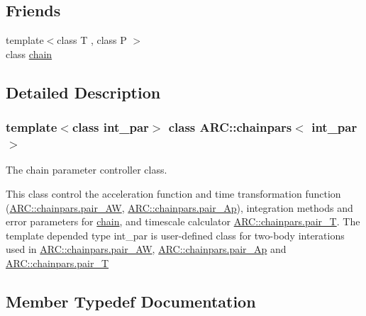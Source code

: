 \subsection*{Friends}
\begin{DoxyCompactItemize}
\item 
{\footnotesize template$<$class T , class P $>$ }\\class \hyperlink{classARC_1_1chainpars_a569feb0e3508338e81284973f08c5750}{chain}
\end{DoxyCompactItemize}


\subsection{Detailed Description}
\subsubsection*{template$<$class int\+\_\+par$>$\newline
class A\+R\+C\+::chainpars$<$ int\+\_\+par $>$}

The chain parameter controller class. 

This class control the acceleration function and time transformation function (\hyperlink{classARC_1_1chainpars_a9558124278a55c0301642e1df63be063}{A\+R\+C\+::chainpars.\+pair\+\_\+\+AW}, \hyperlink{classARC_1_1chainpars_a80fcc6e3b5ce69025126bc49d90f233c}{A\+R\+C\+::chainpars.\+pair\+\_\+\+Ap}), integration methods and error parameters for \hyperlink{classARC_1_1chain}{chain}, and timescale calculator \hyperlink{classARC_1_1chainpars_a860194e916f3ae900e93beedd277fa3c}{A\+R\+C\+::chainpars.\+pair\+\_\+T}. The template depended type int\+\_\+par is user-\/defined class for two-\/body interations used in \hyperlink{classARC_1_1chainpars_a9558124278a55c0301642e1df63be063}{A\+R\+C\+::chainpars.\+pair\+\_\+\+AW}, \hyperlink{classARC_1_1chainpars_a80fcc6e3b5ce69025126bc49d90f233c}{A\+R\+C\+::chainpars.\+pair\+\_\+\+Ap} and \hyperlink{classARC_1_1chainpars_a860194e916f3ae900e93beedd277fa3c}{A\+R\+C\+::chainpars.\+pair\+\_\+T} 

\subsection{Member Typedef Documentation}
\hypertarget{classARC_1_1chainpars_a80fcc6e3b5ce69025126bc49d90f233c}{}\label{classARC_1_1chainpars_a80fcc6e3b5ce69025126bc49d90f233c} 
